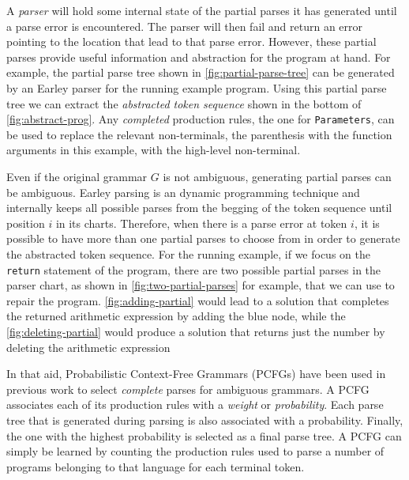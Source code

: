  A \emph{parser} will hold some
internal state of the partial parses it has generated until a parse error is
encountered. The parser will then fail and return an error pointing to the
location that lead to that parse error. However, these partial parses provide
useful information and abstraction for the program at hand. For example, the
partial parse tree shown in \autoref{fig:partial-parse-tree} can be generated by
an Earley parser for the running example program. Using this partial parse tree
we can extract the \emph{abstracted token sequence} shown in the bottom of
\autoref{fig:abstract-prog}. Any \emph{completed} production rules, \eg the
one for \texttt{Parameters}, can be used to replace the relevant non-terminals,
\eg the parenthesis with the function arguments in this example, with the
high-level non-terminal.





 Even if the original grammar $G$ is
not ambiguous, generating partial parses can be ambiguous. Earley parsing is an
dynamic programming technique and internally keeps all possible parses from the
begging of the token sequence until position $i$ in its charts. Therefore, when
there is a parse error at token $i$, it is possible to have more than one
partial parses to choose from in order to generate the abstracted token
sequence. For the running example, if we focus on the \texttt{return} statement
of the program, there are two possible partial parses in the parser chart, as
shown in \autoref{fig:two-partial-parses} for example, that we can use to repair the program. \autoref{fig:adding-partial} would lead to a solution that completes the returned arithmetic expression by adding the blue node, while the \autoref{fig:deleting-partial} would produce a solution that returns just the number by deleting the arithmetic expression

In that aid, Probabilistic Context-Free Grammars (PCFGs) have been used in
previous work \citep{?} to select \emph{complete} parses for ambiguous grammars.
A PCFG associates each of its production rules with a \emph{weight} or
\emph{probability}. Each parse tree that is generated during parsing is also
associated with a probability. Finally, the one with the highest probability is
selected as a final parse tree. A PCFG can simply be learned \citep{?} by
counting the production rules used to parse a number of programs belonging to
that language for each terminal token.

